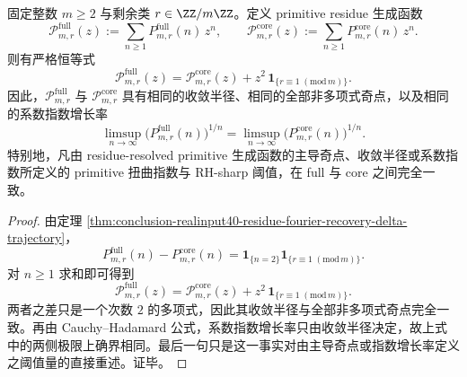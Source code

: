 \begin{theorem}\label{thm:conclusion-realinput40-primitive-residue-monomial-rigidity}
固定整数 \(m\ge 2\) 与剩余类 \(r\in\ZZ/m\ZZ\)。定义 primitive residue 生成函数
\[
\mathcal P_{m,r}^{\mathrm{full}}(z)
:=
\sum_{n\ge 1}P_{m,r}^{\mathrm{full}}(n)\,z^n,
\qquad
\mathcal P_{m,r}^{\mathrm{core}}(z)
:=
\sum_{n\ge 1}P_{m,r}^{\mathrm{core}}(n)\,z^n.
\]
则有严格恒等式
\[
\boxed{\;
\mathcal P_{m,r}^{\mathrm{full}}(z)
=
\mathcal P_{m,r}^{\mathrm{core}}(z)
+z^2\,\mathbf 1_{\{r\equiv 1\;(\mathrm{mod}\,m)\}}.\;}
\]
因此，\(\mathcal P_{m,r}^{\mathrm{full}}\) 与 \(\mathcal P_{m,r}^{\mathrm{core}}\) 具有相同的收敛半径、相同的全部非多项式奇点，以及相同的系数指数增长率
\[
\limsup_{n\to\infty}\bigl(P_{m,r}^{\mathrm{full}}(n)\bigr)^{1/n}
=
\limsup_{n\to\infty}\bigl(P_{m,r}^{\mathrm{core}}(n)\bigr)^{1/n}.
\]
特别地，凡由 residue-resolved primitive 生成函数的主导奇点、收敛半径或系数指数所定义的 primitive 扭曲指数与 RH-sharp 阈值，在 full 与 core 之间完全一致。
\end{theorem}
\begin{proof}
由定理 \ref{thm:conclusion-realinput40-residue-fourier-recovery-delta-trajectory}，
\[
P_{m,r}^{\mathrm{full}}(n)-P_{m,r}^{\mathrm{core}}(n)
=
\mathbf 1_{\{n=2\}}\mathbf 1_{\{r\equiv 1\;(\mathrm{mod}\,m)\}}.
\]
对 \(n\ge 1\) 求和即可得到
\[
\mathcal P_{m,r}^{\mathrm{full}}(z)
=
\mathcal P_{m,r}^{\mathrm{core}}(z)
+z^2\,\mathbf 1_{\{r\equiv 1\;(\mathrm{mod}\,m)\}}.
\]
两者之差只是一个次数 \(2\) 的多项式，因此其收敛半径与全部非多项式奇点完全一致。再由 Cauchy--Hadamard 公式，系数指数增长率只由收敛半径决定，故上式中的两侧极限上确界相同。最后一句只是这一事实对由主导奇点或指数增长率定义之阈值量的直接重述。证毕。
\end{proof}

